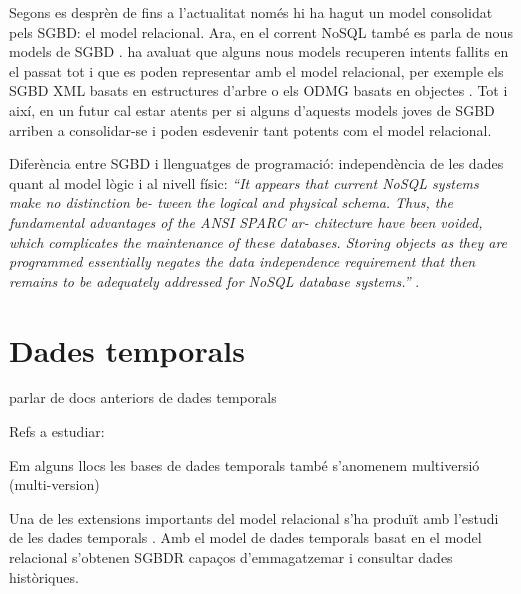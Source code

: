 Segons es desprèn de \textcite{date06} fins a l'actualitat només hi ha
hagut un model consolidat pels SGBD: el model relacional.  Ara, en el
corrent NoSQL també es parla de nous models de
SGBD \parencite{edlich:nosql,stonebraker09:scidb}.
\citeauthor{date06} ha avaluat que alguns nous models recuperen
intents fallits en el passat tot i que es poden representar amb el
model relacional, per exemple els SGBD XML basats en estructures
d'arbre \parencite[cap.~14]{date06} \parencite[cap.~27]{date04:introduction8}
o els ODMG basats en objectes \parencite[cap.~27]{date06}. Tot i així,
en un futur cal estar atents per si alguns d'aquests models joves de
SGBD arriben a consolidar-se i poden esdevenir tant potents com el
model relacional.


\todo{}
Diferència entre SGBD i llenguatges de programació: independència de les dades quant al model lògic i al nivell físic: \emph{``It appears that
current NoSQL systems make no distinction be-
tween the logical and physical schema. Thus, the
fundamental advantages of the ANSI SPARC ar-
chitecture have been voided, which complicates the
maintenance of these databases. Storing objects as
they are programmed essentially negates the data
independence requirement that then remains to be
adequately addressed for NoSQL database systems.''}  \textcite{atzeni13:relational_model_dead}.








\section{Dades temporals}
\label{sec:art:dades_temporals}

parlar de docs anteriors de dades temporals

Refs a estudiar:

\cite{jensen99:temporaldata}
\cite{jensen00:thesis}
\cite{jensen98:temporal_database_glossary}
\cite{tansel93:temporal_databases}


Em alguns llocs les bases de dades temporals també s'anomenem multiversió (multi-version)


Una de les extensions importants del model relacional s'ha produït amb
l'estudi de les dades
temporals \parencite{date02:_tempor_data_relat_model}. Amb el model de
dades temporals basat en el model relacional s'obtenen SGBDR capaços
d'emmagatzemar i consultar dades històriques.

